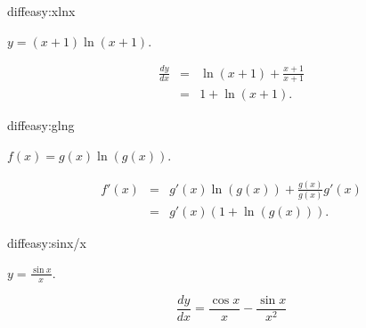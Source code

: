 \begin{defproblem}{diffeasy:xlnx}%
\begin{onlyproblem}%
$y = (x+1)\ln(x+1)$.
\end{onlyproblem}%
\begin{onlysolution}%
\begin{eqnarray*}
\frac{dy}{dx} & = & \ln(x+1) + \frac{x+1}{x+1}\\
 & = & 1 + \ln(x+1).
\end{eqnarray*}
\end{onlysolution}
\end{defproblem}

\begin{defproblem}{diffeasy:glng}%
\begin{onlyproblem}%
$f(x) = g(x)\ln(g(x))$.
\end{onlyproblem}
\begin{onlysolution}%
\begin{eqnarray*}
f'(x) & = & g'(x)\ln(g(x)) + \frac{g(x)}{g(x)}g'(x)\\
 & = & g'(x)(1+\ln(g(x))).
\end{eqnarray*}
\end{onlysolution}%
\end{defproblem}

\begin{defproblem}{diffeasy:sinx/x}
\begin{onlyproblem}%
$y = \frac{\sin x}{x}$.
\end{onlyproblem}
\begin{onlysolution}%
\[\frac{dy}{dx} = \frac{\cos x}{x} - \frac{\sin x}{x^2}\]
\end{onlysolution}%
\end{defproblem}

